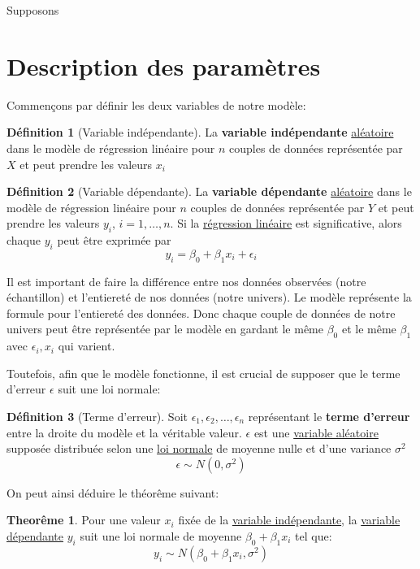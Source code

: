 \documentclass[12pt]{book}
\theoremstyle{definition}
\newtheorem{definition}{Définition}[section]
\newtheorem{theorem}{Theorême}[section]
\begin{document}
Supposons

\section{Description des paramètres}
Commençons par définir les deux variables de notre modèle:

\begin{definition}[Variable indépendante]
    \label{def:variable_independante_modele}
    La \textbf{variable indépendante} \hyperref[def:variable_aleatoire]{aléatoire} dans le modèle de régression linéaire pour $n$ couples de données représentée par $X$ et
    peut prendre les valeurs $x_i$
\end{definition}

\begin{definition}[Variable dépendante]
    \label{def:variable_dependante_modele}
    La \textbf{variable dépendante} \hyperref[def:variable_aleatoire]{aléatoire} dans le modèle de régression linéaire pour $n$ couples de données représentée par $Y$ et
    peut prendre les valeurs $y_i$, $i = 1, \dots, n$.
    Si la \hyperref[def:def:regression_lineaire]{régression linéaire} est significative, alors chaque $y_i$ peut être exprimée par 
    $$ y_i = \beta_0 + \beta_1x_i + \epsilon_i $$
\end{definition}

Il est important de faire la différence entre nos données observées (notre échantillon) et l'entiereté de nos données (notre univers).
Le modèle représente la formule pour l'entiereté des données. Donc chaque couple de données de notre univers peut être représentée 
par le modèle en gardant le même $\beta_0$ et le même $\beta_1$ avec $\epsilon_i, x_i$ qui varient. 

Toutefois, afin que le modèle fonctionne, il est crucial de supposer que le terme d'erreur $\epsilon$ suit une loi normale:

\begin{definition}[Terme d'erreur]
    \label{def:terme_erreur}
    Soit $\epsilon_1, \epsilon_2, \dots, \epsilon_n$ représentant le \textbf{terme d'erreur} entre 
    la droite du modèle et la véritable valeur. $\epsilon$ est une \hyperref[def:variable_aleatoire]{variable aléatoire}
    supposée distribuée selon une \hyperref[def:loi_normale]{loi normale} de moyenne nulle et d'une variance $\sigma^2$
    $$ \epsilon \sim N(0, \sigma^2) $$
\end{definition}

On peut ainsi déduire le théorême suivant:
\begin{theorem}
    \label{def:y_loi_normale}
    Pour une valeur $x_i$ fixée de la \hyperref[def:variable_independante_modele]{variable indépendante},
    la \hyperref[def:def:variable_dependante_modele]{variable dépendante} $y_i$ suit une loi normale de moyenne 
    $\beta_0 + \beta_1x_i$ tel que:
    $$ y_i \sim N(\beta_0 + \beta_1x_i, \sigma^2) $$
\end{theorem}
\end{document}
